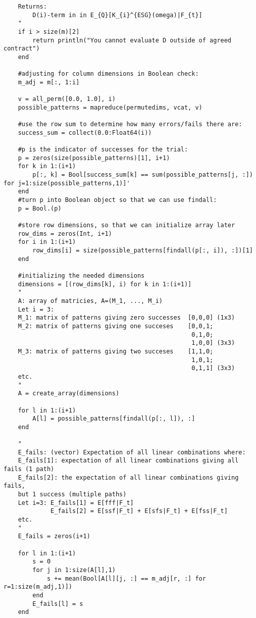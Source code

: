 \begin{verbatim}
    Returns: 
        D(i)-term in in E_{Q}[K_{i}^{ESG}(omega)|F_{t}]    
    "
    if i > size(m)[2]
        return println("You cannot evaluate D outside of agreed contract")
    end
    
    #adjusting for column dimensions in Boolean check:
    m_adj = m[:, 1:i]

    v = all_perm([0.0, 1.0], i)
    possible_patterns = mapreduce(permutedims, vcat, v)
    
    #use the row sum to determine how many errors/fails there are:
    success_sum = collect(0.0:Float64(i))
    
    #p is the indicator of successes for the trial:
    p = zeros(size(possible_patterns)[1], i+1)
    for k in 1:(i+1)
        p[:, k] = Bool[success_sum[k] == sum(possible_patterns[j, :]) for j=1:size(possible_patterns,1)]'
    end
    #turn p into Boolean object so that we can use findall:
    p = Bool.(p)

    #store row dimensions, so that we can initialize array later
    row_dims = zeros(Int, i+1)
    for i in 1:(i+1)
        row_dims[i] = size(possible_patterns[findall(p[:, i]), :])[1]
    end
    
    #initializing the needed dimensions
    dimensions = [(row_dims[k], i) for k in 1:(i+1)] 
    " 
    A: array of matricies, A=(M_1, ..., M_i)
    Let i = 3:
    M_1: matrix of patterns giving zero successes  [0,0,0] (1x3)
    M_2: matrix of patterns giving one succeses    [0,0,1;
                                                    0,1,0; 
                                                    1,0,0] (3x3)
    M_3: matrix of patterns giving two succeses    [1,1,0;
                                                    1,0,1;
                                                    0,1,1] (3x3)                                                
    etc. 
    "
    A = create_array(dimensions) 

    for l in 1:(i+1)
        A[l] = possible_patterns[findall(p[:, l]), :]
    end

    " 
    E_fails: (vector) Expectation of all linear combinations where: 
    E_fails[1]: expectation of all linear combinations giving all fails (1 path)
    E_fails[2]: the expectation of all linear combinations giving fails, 
    but 1 success (multiple paths)
    Let i=3: E_fails[1] = E[fff|F_t]
             E_fails[2] = E[ssf|F_t] + E[sfs|F_t] + E[fss|F_t]
    etc.
    "
    E_fails = zeros(i+1)

    for l in 1:(i+1)
        s = 0 
        for j in 1:size(A[l],1)
            s += mean(Bool[A[l][j, :] == m_adj[r, :] for r=1:size(m_adj,1)])
        end
        E_fails[l] = s
    end 
    

\end{verbatim}
